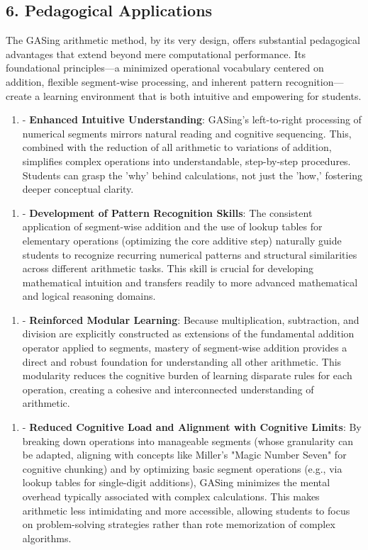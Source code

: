 \subsection{6. Pedagogical Applications}
The GASing arithmetic method, by its very design, offers substantial pedagogical advantages that extend beyond mere computational performance. Its foundational principles—a minimized operational vocabulary centered on addition, flexible segment-wise processing, and inherent pattern recognition—create a learning environment that is both intuitive and empowering for students.

\begin{enumerate}
  \item - \textbf{Enhanced Intuitive Understanding}: GASing's left-to-right processing of numerical segments mirrors natural reading and cognitive sequencing. This, combined with the reduction of all arithmetic to variations of addition, simplifies complex operations into understandable, step-by-step procedures. Students can grasp the 'why' behind calculations, not just the 'how,' fostering deeper conceptual clarity.
\end{enumerate}

\begin{enumerate}
  \item - \textbf{Development of Pattern Recognition Skills}: The consistent application of segment-wise addition and the use of lookup tables for elementary operations (optimizing the core additive step) naturally guide students to recognize recurring numerical patterns and structural similarities across different arithmetic tasks. This skill is crucial for developing mathematical intuition and transfers readily to more advanced mathematical and logical reasoning domains.
\end{enumerate}

\begin{enumerate}
  \item - \textbf{Reinforced Modular Learning}: Because multiplication, subtraction, and division are explicitly constructed as extensions of the fundamental addition operator applied to segments, mastery of segment-wise addition provides a direct and robust foundation for understanding all other arithmetic. This modularity reduces the cognitive burden of learning disparate rules for each operation, creating a cohesive and interconnected understanding of arithmetic.
\end{enumerate}

\begin{enumerate}
  \item - \textbf{Reduced Cognitive Load and Alignment with Cognitive Limits}: By breaking down operations into manageable segments (whose granularity can be adapted, aligning with concepts like Miller's "Magic Number Seven" for cognitive chunking) and by optimizing basic segment operations (e.g., via lookup tables for single-digit additions), GASing minimizes the mental overhead typically associated with complex calculations. This makes arithmetic less intimidating and more accessible, allowing students to focus on problem-solving strategies rather than rote memorization of complex algorithms.
\end{enumerate}


